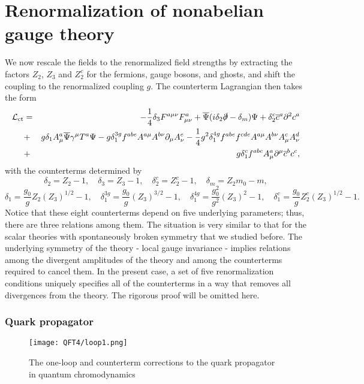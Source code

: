 \section{Renormalization of nonabelian gauge theory}
We now rescale the fields to the renormalized field strengths by extracting the factors $Z_2$, $Z_3$ and $Z_2^c$ for the fermions, gauge bosons, and ghosts, and shift the coupling to the renormalized coupling $g$. The counterterm Lagrangian then takes the form
\begin{eqnarray}
\mathcal{L}_{\rm ct} &=& -\frac{1}{4}\delta_3 F^{a\mu\nu}F^a_{\mu\nu} + \overline{\Psi}(i\delta_2\slashed{\partial}-\delta_m)\Psi + \delta_2^c \overline{c}^a \partial^2 c^a \nonumber \\
&+& g\delta_1 A^a_{\mu}\overline{\Psi}\gamma^{\mu}T^a\Psi -g\delta_{1}^{3g} f^{abe}A^{a\mu}A^{b\nu}\partial_{\mu}A^e_{\nu} - \frac{1}{4}g^2\delta_1^{4g} f^{abe}f^{cde}A^{a\mu}A^{b\nu}A^c_{\mu}A^d_{\nu} \nonumber \\
&+& g\delta_1^c f^{abc}A^a_{\mu}\partial^{\mu}\overline{c}^b c^c ,\nonumber
\end{eqnarray}
with the counterterms determined by
\[\delta_2 = Z_2 - 1 , \quad \delta_3 = Z_3 - 1 , \quad \delta_2^c = Z_2^c - 1 , \quad \delta_m = Z_2m_0-m,\]
\[\delta_1 = \frac{g_0}{g}Z_2(Z_3)^{1/2} - 1 , \quad \delta_1^{3g} = \frac{g_0}{g}(Z_3)^{3/2} - 1 , \quad \delta_1^{4g} = \frac{g_0^2}{g^2}(Z_3)^2 - 1 , \quad \delta_1^c = \frac{g_0}{g}Z_2^c(Z_3)^{1/2} - 1.\]
Notice that these eight counterterms depend on five underlying parameters; thus, there are three relations among them. The situation is very similar to that for the scalar theories with spontaneously broken symmetry that we studied before. 
The underlying symmetry of the theory - local gauge invariance - implies relations among the divergent amplitudes of the theory and among the counterterms required to cancel them. 
In the present case, a set of five renormalization conditions uniquely specifies all of the counterterms in a way that removes all divergences from the theory.
The rigorous proof will be omitted here.

\subsubsection{Quark propagator}
\begin{figure}[!h]
	\centering
	\texttt{[image: QFT4/loop1.png]}
	\caption{The one-loop and counterterm corrections to the quark propagator in quantum chromodynamics}
\end{figure}

